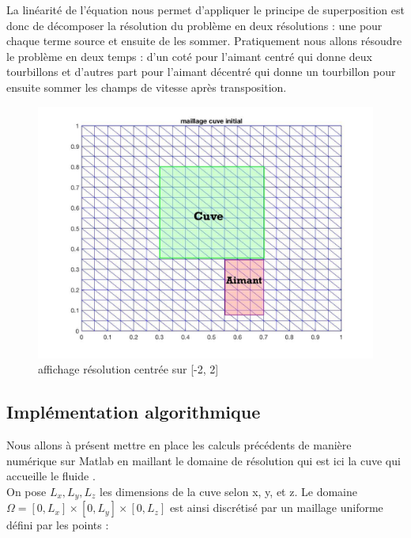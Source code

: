 \documentclass[a4paper,12pt,titlepage]{report}
\begin{document}
\begin{onehalfspace}

La linéarité de l'équation nous permet d'appliquer le principe de superposition est donc de décomposer la résolution du problème en deux résolutions : une pour chaque terme source et ensuite de les sommer.
Pratiquement nous allons résoudre le problème en deux temps : d'un coté pour l'aimant centré qui donne deux tourbillons et d'autres part pour l'aimant décentré qui donne un tourbillon pour ensuite sommer les champs de vitesse après transposition.

\begin{figure}[!h]
	\begin{center}
	\includegraphics[height = 8 cm, keepaspectratio]{graphes/Maillage_initial1.jpg}
	\caption{affichage résolution centrée sur [-2, 2]}
	\label{figure 1}
	\end{center}
\end{figure}

\subsection{Implémentation algorithmique}

Nous allons à présent mettre en place les calculs précédents de manière numérique sur Matlab en maillant le domaine de résolution qui est ici la cuve qui accueille le fluide .  
\\ 
On pose $ L_x,  L_y,  L_z$ les dimensions de la cuve selon x, y, et z.
\newline
Le domaine $\Omega = [0, L_x]\times[0, L_y]\times[0, L_z]$ est ainsi discrétisé par un maillage uniforme défini par les points : 
\\


\end{onehalfspace}
\end{document}
